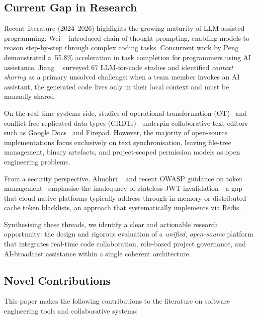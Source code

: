 \subsection{Current Gap in Research}

Recent literature (2024--2026) highlights the growing maturity of LLM-assisted
programming. Wei \etal~\cite{wei2022chain} introduced chain-of-thought
prompting, enabling models to reason step-by-step through complex coding
tasks. Concurrent work by Peng \etal~\cite{peng2023impact} demonstrated
a~55.8\% acceleration in task completion for programmers using AI assistance.
Jiang \etal~\cite{jiang2024survey} surveyed 67 LLM-for-code studies and
identified \emph{context sharing} as a primary unsolved challenge: when a team
member invokes an AI assistant, the generated code lives only in their local
context and must be manually shared.

On the real-time systems side, studies of operational-transformation
(OT)~\cite{sun1998operational} and conflict-free replicated data types
(CRDTs)~\cite{shapiro2011conflict} underpin collaborative text editors such as
Google Docs~\cite{googledocs2010} and Firepad. However, the majority of
open-source implementations focus exclusively on text synchronisation, leaving
file-tree management, binary artefacts, and project-scoped permission models
as open engineering problems.

From a security perspective, Almohri \etal~\cite{almohri2023security} and
recent OWASP guidance on token management~\cite{owasp2024jwt} emphasise the
inadequacy of stateless JWT invalidation---a gap that cloud-native platforms
typically address through in-memory or distributed-cache token blacklists, an
approach that \echoray systematically implements via Redis.

Synthesising these threads, we identify a clear and actionable research
opportunity: the design and rigorous evaluation of a \emph{unified},
\emph{open-source} platform that integrates real-time code collaboration,
role-based project governance, and AI-broadcast assistance within a single
coherent architecture.

\subsection{Novel Contributions}

This paper makes the following contributions to the literature on software
engineering tools and collaborative systems:

